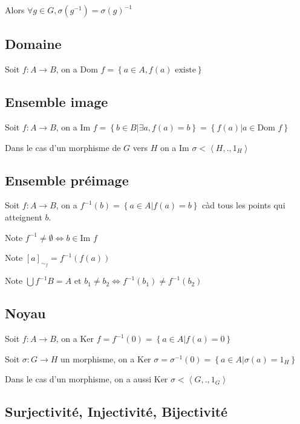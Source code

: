 \documentclass[a4paper,10pt]{article}
\newcommand{\dom}{\mbox{Dom }}
\newcommand{\Ker}{\mbox{Ker }}
\newcommand{\im}{\mbox{Im }}
\newcommand{\grp}[1]{\left\langle #1 \right\rangle}
\newcommand{\ap}{\rightarrow}
\newcommand{\ioi}{\Leftrightarrow}
\newcommand{\tset}[1]{\left\lbrace #1 \right\rbrace}
\begin{document}
Alors $\forall g \in G, \sigma(g^{-1}) = \sigma(g)^{-1}$

\subsection{Domaine}

Soit $f: A \ap B$, on a $\dom f = \tset{a \in A, f(a) \mbox{ existe}}$

\subsection{Ensemble image}

Soit $f: A \ap B$, on a $\im f = \tset{b \in B \vert \exists a, f(a)=b} = \tset{f(a) \vert a \in \dom f}$

Dans le cas d'un morphisme de $G$ vers $H$ on a $\im \sigma < \grp{H, . , 1_H}$

\subsection{Ensemble préimage}

Soit $f:A \ap B$, on a $f^{-1}(b) = \tset{a \in A \vert f(a) = b}$ càd tous les points qui atteignent $b$.

Note $f^{-1} \neq \emptyset \ioi b \in \im f$

Note $\left[ a \right]_{\sim_f} = f^{-1} (f(a))$

Note $\bigcup f^{-1}B = A$ et $b_1 \neq b_2 \ioi f^{-1}(b_1) \neq f^{-1}(b_2)$


\newpage

\subsection{Noyau}

Soit $f:A \ap B$, on a $\Ker f = f^{-1}(0) = \tset{a \in A \vert f(a) = 0}$

Soit $\sigma: G \ap H$ un morphisme, on a $\Ker \sigma = \sigma^{-1}(0) = \tset{a \in A \vert \sigma(a) = 1_H}$

Dans le cas d'un morphisme, on a aussi $\Ker \sigma < \grp{G, . , 1_G}$ 

\begin{figure}[h]
	\centering{}
\end{figure}
 
\subsection{Surjectivité, Injectivité, Bijectivité}
\end{document}
